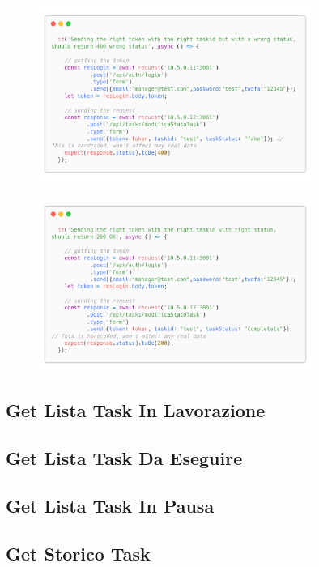 \documentclass{report}
\begin{document}
\begin{figure}[H]
	\centering\includegraphics[width=0.8\textwidth]{images/code_modifica_stato_test5.png}
\end{figure}
\begin{figure}[H]
	\centering\includegraphics[width=0.8\textwidth]{images/code_modifica_stato_test6.png}
\end{figure}


\subsection*{Get Lista Task In Lavorazione}

\subsection*{Get Lista Task Da Eseguire}

\subsection*{Get Lista Task In Pausa}

\subsection*{Get Storico Task}
\end{document}

